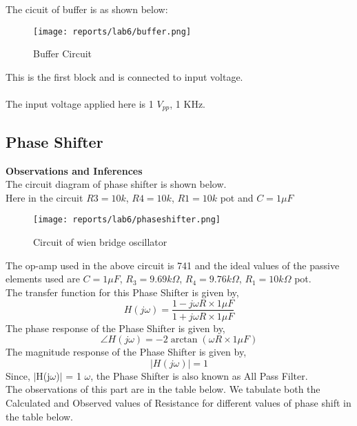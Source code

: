 \documentclass[12pt]{article}
\begin{document}
        The cicuit of buffer is as shown below:  
        \begin{figure}[H]
            \centering
            \texttt{[image: reports/lab6/buffer.png]}
            \caption{Buffer Circuit}
        \end{figure}
        \noindent
        This is the first block and is connected to input voltage.\\\\
        The input voltage applied here is 1 $V_{pp}$, 1 KHz.

    \subsection{Phase Shifter}
        \noindent
        \textbf{Observations and Inferences}\\
        \noindent
        The circuit diagram of phase shifter is shown below.\\
        Here in the circuit $R3 = 10k$, $R4 = 10k$, $R1 = 10k$ pot and $C = 1\mu F$
        \begin{figure}[H]
            \centering
            \texttt{[image: reports/lab6/phaseshifter.png]}
            \caption{Circuit of wien bridge oscillator}
        \end{figure}
        \noindent
        The op-amp used in the above circuit is 741 and the ideal values of the passive elements used are $C = 1\mu F$, $R_3 =9.69k\Omega$, $R_4 = 9.76k\Omega$, $R_1 = 10k\Omega$ pot.\\
        \noindent
        The transfer function for this Phase Shifter is given by,
        \begin{equation}
            H(j\omega)=\frac{1-j\omega R \times 1\mu F}{1+j\omega R \times 1\mu F}
        \end{equation}
        \noindent
        The phase response of the Phase Shifter is given by,
        \begin{equation}
            \angle H(j\omega)=-2\arctan(\omega R \times 1\mu F)
        \end{equation}
        \noindent
        The magnitude response of the Phase Shifter is given by,
        \begin{equation}
            |H(j\omega)|=1
        \end{equation}
        Since, \(|\)H(j\(\omega\))\(|\) = 1 \forall \(\omega\), the Phase Shifter is also known as All Pass Filter.\\
        \noindent
        The observations of this part are in the table below. We tabulate both the Calculated and Observed values of Resistance for different values of phase shift in the table below.
        
\end{document}
